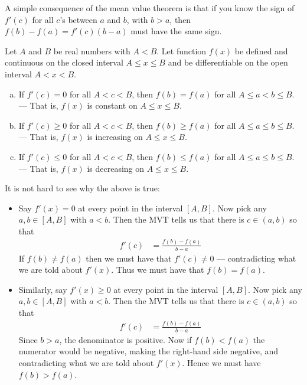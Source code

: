 A simple consequence of the mean value theorem is that if you know the
sign of $f'(c)$ for all $c$'s between $a$ and $b$, with $b>a$, then
$f(b)-f(a) = f'(c) (b-a)$ must have the same sign.
\begin{cor}
\label{cor:DIFFmvtcons}
Let $A$ and $B$ be real numbers with $A<B$.
Let function $f(x)$ be defined and continuous on
the closed interval $A\le x\le B$ and be differentiable on the
open interval $A<x<B$.
\begin{enumerate}[(a)]
\item If $f'(c)=0$ for all $A<c<B$, then $f(b)=f(a)$ for all
$A\le a<b\le B$.\\
--- That is, $f(x)$ is constant on $A\le x\le B$.
\item If $f'(c)\ge 0$ for all $A<c<B$, then $f(b)\ge f(a)$ for all
$A\le a\le b\le B$.\\
--- That is, $f(x)$ is increasing on $A\le x\le B$.
\item If $f'(c)\le 0$ for all $A<c<B$, then $f(b)\le f(a)$ for all
$A\le a \le b\le B$.\\
--- That is, $f(x)$ is decreasing on $A\le x\le B$.
\end{enumerate}

\end{cor}
It is not hard to see why the above is true:
\begin{itemize}
 \item Say $f'(x)=0$ at every point in the interval $[A,B]$. Now pick any $a,b \in [A,B]$
with $a<b$. Then the MVT tells us that there is $c \in (a,b)$ so that
\begin{align*}
  f'(c) &= \frac{f(b)-f(a)}{b-a}
\end{align*}
If $f(b) \neq f(a)$ then we must have that $f'(c) \neq 0$ --- contradicting what we are
told about $f'(x)$. Thus we must have that $f(b)=f(a)$.

\item Similarly, say $f'(x) \geq 0$ at every point in the interval $[A,B]$. Now pick any
$a,b \in [A,B]$  with $a<b$. Then the MVT tells us that there is $c \in (a,b)$ so that
\begin{align*}
  f'(c) &= \frac{f(b)-f(a)}{b-a}
\end{align*}
Since $b>a$, the denominator is positive. Now if $f(b) < f(a)$ the numerator would be
negative, making the right-hand side negative, and contradicting what we are told about
$f'(x)$. Hence we must have $f(b)>f(a)$.
\end{itemize}

